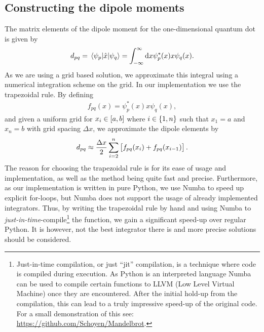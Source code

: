     \subsection{Constructing the dipole moments}
        The matrix elements of the dipole moment for the one-dimensional quantum
        dot is given by
        \begin{align}
            d_{pq}
            = \mel*{\psi_{p}}{\hat{x}}{\psi_{q}}
            = \int_{-\infty}^{\infty}\dd x
            \psi^{*}_{p}(x) x \psi_{q}(x).
        \end{align}
        As we are using a grid based solution, we approximate this integral
        using a numerical integration scheme on the grid.
        In our implementation we use the trapezoidal rule.
        By defining
        \begin{align}
            f_{pq}(x) = \psi^{*}_{p}(x) x \psi_{q}(x),
        \end{align}
        and given a uniform grid for $x_i \in \left[ a, b \right]$ where $i \in \left\{ 1,
        n \right\}$ such that $x_1 = a$ and $x_n = b$ with grid spacing $\Delta x$, we
        approximate the dipole elements by
        \begin{align}
            d_{pq}
            \approx
            \frac{\Delta x}{2}\sum_{i = 2}^{n}\left[ 
                f_{pq}(x_{i}) + f_{pq}(x_{i - 1})
             \right].
        \end{align}
        The reason for choosing the trapezoidal rule is for its ease of usage
        and implementation, as well as the method being quite fast and precise.
        Furthermore, as our implementation is written in pure Python, we use
        Numba \cite{numba} to speed up explicit for-loops, but Numba does not
        support the usage of already implemented integrators.
        Thus, by writing the trapezoidal rule by hand and using Numba to
        \emph{just-in-time}-compile\footnote{%
            Just-in-time compilation, or just ``jit'' compilation, is a
            technique where code is compiled during execution.
            As Python is an interpreted language Numba \cite{numba} can be used
            to compile certain functions to LLVM (Low Level Virtual Machine)
            \cite{llvm} once they are encountered.
            After the initial hold-up from the compilation, this can lead to a
            truly impressive speed-up of the original code.
            For a small demonstration of this see:
            \url{https://github.com/Schoyen/Mandelbrot}.
        } the function, we gain a significant speed-up
        over regular Python.
        It is however, not the best integrator there is and more precise
        solutions should be considered.



